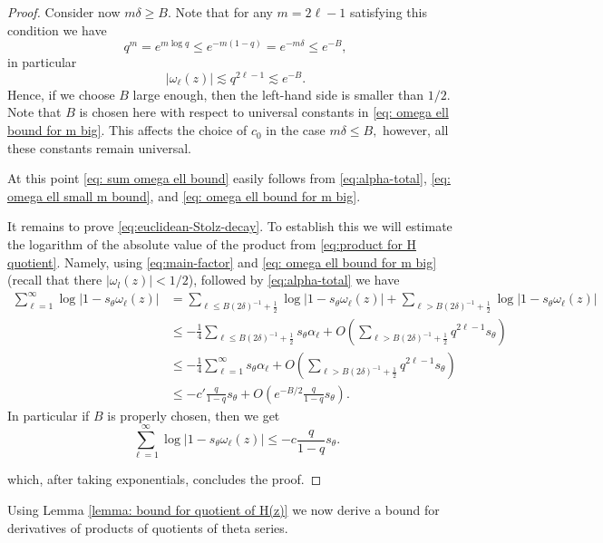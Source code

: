 \documentclass{article}
\theoremstyle{plain}
\numberwithin{equation}{section}
\begin{document}
\begin{proof}
Consider now $m\delta \ge B$. Note that for any $m=2\ell-1$ satisfying this condition we have
\[
q^m=e^{m \log q} \le e^{-m(1-q)}=e^{-m\delta} \le e^{-B}, 
\]
in particular 
\begin{equation} \label{eq: omega ell bound for m big}
    |\omega_{\ell}(z)| \lesssim q^{2\ell-1} \lesssim e^{-B}.
\end{equation}
Hence, if we choose $B$ large enough, then the left-hand side is smaller than $1/2$. Note that $B$ is chosen here
with respect to universal constants in \eqref{eq: omega ell bound for m big}. This affects the choice of $c_0$ in the case $m\delta \le B,$ however, all these constants remain universal. 



At this point \eqref{eq: sum omega ell bound} easily follows from \eqref{eq:alpha-total}, \eqref{eq: omega ell small m bound}, and \eqref{eq: omega ell bound for m big}. 


It remains to prove \eqref{eq:euclidean-Stolz-decay}. To establish this we will estimate the logarithm of the absolute value of the product from 
\eqref{eq:product for H quotient}. Namely, using \eqref{eq:main-factor} and \eqref{eq: omega ell bound for m big} (recall that there $|\omega_l(z)|<1/2$), followed by \eqref{eq:alpha-total} we have
\begin{align*}
 \sum_{\ell=1}^\infty \log|1-s_\theta\omega_\ell(z)|
 &= \sum_{{\ell}\le B(2\delta)^{-1}+{\frac12}}
 \log|1-s_\theta\omega_\ell(z)|
 + \sum_{{\ell}>B(2\delta)^{-1}+{\frac12}}
 \log|1-s_\theta\omega_\ell(z)| \\
 &\le -\frac14
 \sum_{{\ell}\le B(2\delta)^{-1}+{\frac12}}
 s_\theta\alpha_\ell
 +O\left(
 \sum_{{\ell}>B(2\delta)^{-1}+{\frac12}}
 q^{2{\ell}-1}s_\theta
 \right) \\
 &\le -\frac14
 \sum_{{\ell}=1}^\infty s_\theta\alpha_\ell
 +O\left(
 \sum_{{\ell}>B(2\delta)^{-1}+{\frac12}}
 q^{2{\ell}-1}s_\theta
 \right) \\
 &\le -{c'}\frac{q}{1-q}s_\theta
 +O\left(e^{-B/2}\frac{q}{1-q}s_\theta\right).
\end{align*}
In particular if $B$ is properly chosen, then we get 
\[
 \sum_{\ell=1}^\infty \log|1- s_\theta \omega_\ell(z)| \le -{c} \frac{q}{1-q}s_\theta.
\]

which, after taking exponentials, concludes the proof. 
\end{proof}
Using Lemma \ref{lemma: bound for quotient of H(z)} we now derive a bound for derivatives of products of quotients of theta series.
\end{document}
